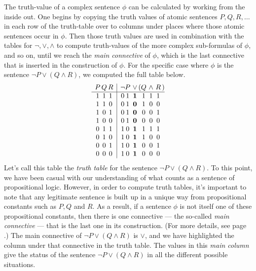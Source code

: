 The truth-value of a complex sentence $\phi$ can be calculated by
working from the inside out.  One begins by copying the truth values
of atomic sentences $P,Q,R,\dots$ in each row of the truth-table over
to columns under places where those atomic sentences occur in $\phi$.
Then those truth values are used in combination with the tables for
$\neg ,\vee ,\wedge$ to compute truth-values of the more complex
sub-formulas of $\phi$, and so on, until we reach the \emph{main
  connective} of $\phi$, which is the last connective that is inserted
in the construction of $\phi$.  For the specific case where $\phi$ is
the sentence $\neg P\vee (Q\wedge R)$, we computed the full table below.
\[ \begin{array}{ c@{\, }c@{\, }c | c@{ }c@{\, }@{\, }c@{\, }c@{ }c@{\, }@{\, }c@{\, }@{\, }c@{\, }@{ }c@{ }@{}c@{}@{ }c}
     P & Q & R   & \neg  & P & \vee & ( & Q & \wedge  & R & ) & \\
\hline 
1 & 1 & 1   & 0 & 1 & \mathbf{1} &  & 1 & 1 & 1 &  & \\
1 & 1 & 0   & 0 & 1 & \mathbf{0} &  & 1 & 0 & 0 &  & \\
1 & 0 & 1   & 0 & 1 & \mathbf{0} &  & 0 & 0 & 1 &  & \\
1 & 0 & 0   & 0 & 1 & \mathbf{0} &  & 0 & 0 & 0 &  & \\
0 & 1 & 1   & 1 & 0 & \mathbf{1} &  & 1 & 1 & 1 &  & \\
0 & 1 & 0   & 1 & 0 & \mathbf{1} &  & 1 & 0 & 0 &  & \\
0 & 0 & 1   & 1 & 0 & \mathbf{1} &  & 0 & 0 & 1 &  & \\
0 & 0 & 0   & 1 & 0 & \mathbf{1} &  & 0 & 0 & 0 &  & \\
   \end{array} \]
 Let's call this table the \emph{truth table} for the sentence
 $\neg P\vee (Q\wedge R)$.  To this point, we have been casual with our understanding of what
 counts as a sentence of propositional logic.  However, in order to
 compute truth tables, it's important to note that any legitimate
 sentence is built up in a unique way from propositional constants such
 as $P,Q$ and $R$.  As a result, if a sentence $\phi$ is not itself one
 of these propositional constants, then there is one connective ---
 the so-called \emph{main connective} --- that is
 the last one in its construction.  (For more details, see page
 \pageref{formation}.)  
 The main connective of $\neg P\vee (Q\wedge R)$ is
 $\vee$, and we have highlighted the column under that connective in the
 truth table.  The values in this \emph{main column} give the status
 of the sentence $\neg P\vee (Q\wedge R)$ in all the different
 possible situations.

